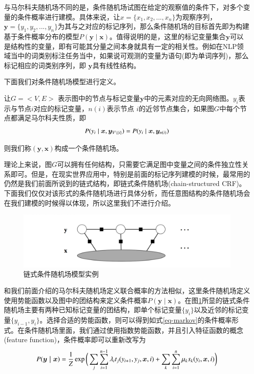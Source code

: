 与马尔科夫随机场不同的是，条件随机场试图在给定的观察值的条件下，对多个变量的条件概率进行建模。具体来说，让$x = \{x_1, x_2,...,x_n\}$为观察序列，$\bm{y} = \{y_1, y_2,...,y_n\}$为其与之对应的标记序列，那么条件随机场的目标首先即为构建基于条件概率分布的模型$P(\bm{y} \mid \bm{x})$。值得说明的是，这里的标记变量集合$\bm{y}$可以是结构性的变量，即有可能其分量之间本身就具有一定的相关性。例如在NLP领域当中的词类别标注任务当中，如果说可观测的变量为语句(即为单词序列)，那么标记相应的词类别序列，即 $\bm{y}$具有线性结构。


下面我们对条件随机场模型进行定义。

让$G = <V,E>$ 表示图中的节点与标记变量$\bm{y}$中的元素对应的无向网络图。$y_i$表示与节点$i$对应的标记变量，$n(i)$表示节点
$i$的近邻节点集合，如果图$G$中每个节点都满足马尔科夫性质，即
\begin{equation}
P(y_i \mid \bm{x},\bm{y}_{V \backslash \{i\}}) = P(y_i \mid \bm{x}, \bm{y}_{n(i)}) \\
\end{equation}

则我们称$(\bm{y}, \bm{x})$构成一个条件随机场。


理论上来说，图$G$可以拥有任何结构，只需要它满足图中变量之间的条件独立性关系即可。但是，在现实世界应用中，特别是前面的标记序列建模的时候，最常用的仍然是我们前面所说到的链式结构，即链式条件随机场(chain-structured CRF)。下面我们仅仅对该形式的条件随机场进行具体分析，而任意图结构的条件随机场会在我们建模的时候得以体现，所以这里我们不进行介绍。



\begin{figure}[ht]
    \centering
    \includegraphics[scale=1, width=\textwidth]{figure/linearchain-crf.PNG}
    \caption{链式条件随机场模型实例}
    \label{fig-linear-crf}
\end{figure}


和我们前面介绍的马尔科夫随机场定义联合概率的方法相似，这里条件随机场定义使用势能函数以及图中的团结构来定义条件概率$P(\bm{y \mid x})$。在图\ref{fig-linear-crf}所显的链式条件随机场主要有两种已知标记变量的团结构，即单个标记变量$\{y_i\}$以及近邻的标记变量$\{y_{i-1}, y_i\}$。选择合适的势能函数，则可以得到如式\ref{eq-markov}的条件概率形式。在条件随机场里面，我们通过使用指数势能函数，并且引入特征函数的概念(feature function)，条件概率即可以重新改写为
\begin{equation}
	P(\bm{y \mid x}) = \frac{1}{Z} \exp \bigg(\sum_j \sum_{i = 1}^{n - 1} \lambda_i t_j (y_{i+1}, y_j, \bm{x}, i) + \sum_{k} \sum_{i= 1}^{n} \mu_{k} s_{k}(y_i, \bm{x}, i) \bigg) \\
	\label{eq-lin-crf}
\end{equation}


